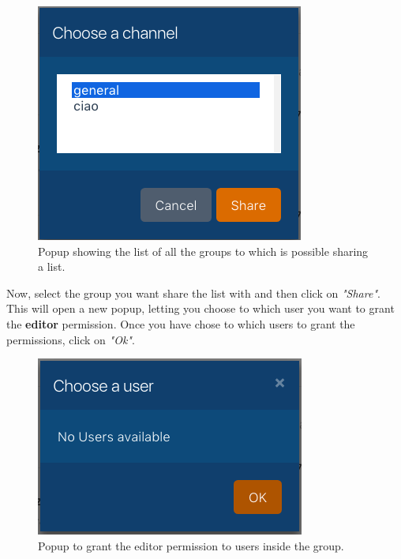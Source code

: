 \begin{figure}[H]
  \centering 
  \includegraphics[scale=1.0]{Sections/3-HowToUse/Images/list_share_group.png}
  \caption{Popup showing the list of all the groups to which is possible sharing a list.}
\end{figure}

Now, select the group you want share the list with and then click on \textit{"Share"}. \\
This will open a new popup, letting you choose to which user you want to grant the \textbf{editor} permission. Once you have chose to which users to grant the permissions, click on \textit{"Ok"}.

\begin{figure}[H]
  \centering 
  \includegraphics[scale=1.0]{Sections/3-HowToUse/Images/list_share_user.png}
  \caption{Popup to grant the editor permission to users inside the group.}
\end{figure}
